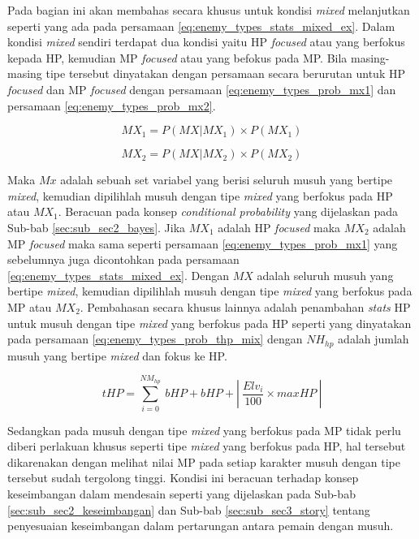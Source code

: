 Pada bagian ini akan membahas secara khusus untuk kondisi \textit{mixed} melanjutkan seperti yang ada pada persamaan \ref{eq:enemy_types_stats_mixed_ex}. Dalam kondisi \textit{mixed} sendiri terdapat dua kondisi yaitu HP \textit{focused} atau yang berfokus kepada HP, kemudian MP \textit{focused} atau yang befokus pada MP. Bila masing-masing tipe tersebut dinyatakan dengan persamaan secara berurutan untuk HP \textit{focused} dan MP \textit{focused} dengan persamaan \ref{eq:enemy_types_prob_mx1} dan persamaan \ref{eq:enemy_types_prob_mx2}. 
\vspace{1ex}

\begin{equation}\label{eq:enemy_types_prob_mx1}
MX_{1} = P(MX | MX_{1}) \times P(MX_{1})
\end{equation}

\begin{equation}\label{eq:enemy_types_prob_mx2}
MX_{2} = P(MX | MX_{2}) \times P(MX_{2})
\end{equation}

Maka $Mx$ adalah sebuah set variabel yang berisi seluruh musuh yang bertipe \textit{mixed}, kemudian dipilihlah musuh dengan tipe \textit{mixed} yang berfokus pada HP atau $MX_{1}$. Beracuan pada konsep \textit{conditional probability} yang dijelaskan pada Sub-bab \ref{sec:sub_sec2_bayes}. Jika $MX_{1}$ adalah HP \textit{focused} maka  $MX_{2}$ adalah MP \textit{focused} maka sama seperti persamaan \ref{eq:enemy_types_prob_mx1} yang sebelumnya juga dicontohkan pada persamaan \ref{eq:enemy_types_stats_mixed_ex}. Dengan $MX$ adalah seluruh musuh yang bertipe \textit{mixed}, kemudian dipilihlah musuh dengan tipe \textit{mixed} yang berfokus pada MP atau $MX_{2}$. Pembahasan secara khusus lainnya adalah penambahan \textit{stats} HP untuk musuh dengan tipe \textit{mixed} yang berfokus pada HP seperti yang dinyatakan pada persamaan \ref{eq:enemy_types_prob_thp_mix} dengan $NH_{hp}$ adalah jumlah musuh yang bertipe \textit{mixed} dan fokus ke HP. 
\vspace{1ex}

\begin{equation}\label{eq:enemy_types_prob_thp_mix}
tHP = \sum_{i=0}^{NM_{hp}}\ bHP + bHP + \left |\ \frac{Elv_{i}}{100} \times maxHP\ \right |
\end{equation}

Sedangkan pada musuh dengan tipe \textit{mixed} yang berfokus pada MP tidak perlu diberi perlakuan khusus seperti tipe \textit{mixed} yang berfokus pada HP, hal tersebut dikarenakan dengan melihat nilai MP pada setiap karakter musuh dengan tipe tersebut sudah tergolong tinggi. Kondisi ini beracuan terhadap konsep keseimbangan dalam mendesain seperti yang dijelaskan pada Sub-bab \ref{sec:sub_sec2_keseimbangan} dan Sub-bab \ref{sec:sub_sec3_story} tentang penyesuaian keseimbangan dalam pertarungan antara pemain dengan musuh.
\vspace{1ex}

